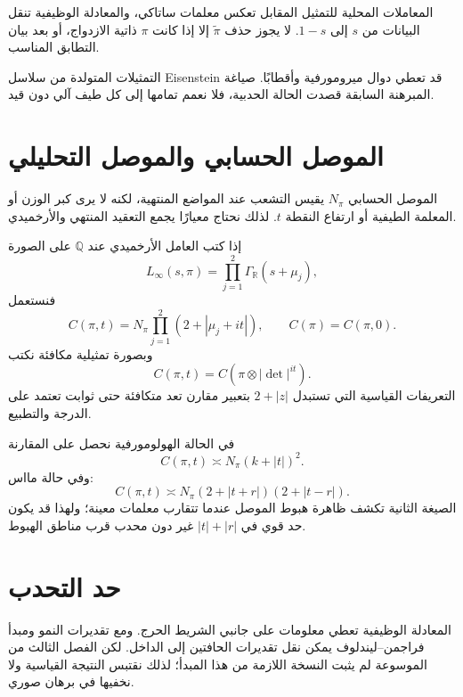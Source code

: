 \begin{remark}
المعاملات المحلية للتمثيل المقابل تعكس معلمات ساتاكي، والمعادلة
الوظيفية تنقل البيانات من \(s\) إلى \(1-s\). لا يجوز حذف
\(\widetilde\pi\) إلا إذا كانت \(\pi\) ذاتية الازدواج، أو بعد بيان
التطابق المناسب.
\end{remark}

\begin{remark}
التمثيلات المتولدة من سلاسل Eisenstein قد تعطي دوال ميرومورفية وأقطابًا.
صياغة المبرهنة السابقة قصدت الحالة الحدبية، فلا نعمم تمامها إلى كل طيف
آلي دون قيد.
\end{remark}

\section{الموصل الحسابي والموصل التحليلي}

الموصل الحسابي \(N_\pi\) يقيس التشعب عند المواضع المنتهية، لكنه لا
يرى كبر الوزن أو المعلمة الطيفية أو ارتفاع النقطة \(t\). لذلك نحتاج
معيارًا يجمع التعقيد المنتهي والأرخميدي.

\begin{definition}
\label{def:ch21-analytic-conductor}
إذا كتب العامل الأرخميدي عند \(\mathbb Q\) على الصورة
\[
L_\infty(s,\pi)=
\prod_{j=1}^{2}\Gamma_{\mathbb R}(s+\mu_j),
\]
فنستعمل
\[
C(\pi,t)
=
N_\pi\prod_{j=1}^{2}(2+|\mu_j+it|),
\qquad
C(\pi)=C(\pi,0).
\]
وبصورة تمثيلية مكافئة نكتب
\[
C(\pi,t)=C\!\left(\pi\otimes|\det|^{it}\right).
\]
التعريفات القياسية التي تستبدل \(2+|z|\) بتعبير مقارن تعد متكافئة
حتى ثوابت تعتمد على الدرجة والتطبيع.
\end{definition}

في الحالة الهولومورفية نحصل على المقارنة
\[
C(\pi,t)\asymp N_\pi(k+|t|)^2.
\]
وفي حالة مااس:
\[
C(\pi,t)
\asymp
N_\pi(2+|t+r|)(2+|t-r|).
\]
الصيغة الثانية تكشف ظاهرة هبوط الموصل عندما تتقارب معلمات معينة؛ ولهذا
قد يكون حد قوي في \(|t|+|r|\) غير دون محدب قرب مناطق الهبوط.

\section{حد التحدب}

المعادلة الوظيفية تعطي معلومات على جانبي الشريط الحرج. ومع تقديرات
النمو ومبدأ فراجمن--ليندلوف يمكن نقل تقديرات الحافتين إلى الداخل. لكن
الفصل الثالث من الموسوعة لم يثبت النسخة اللازمة من هذا المبدأ؛ لذلك
نقتبس النتيجة القياسية ولا نخفيها في برهان صوري.

